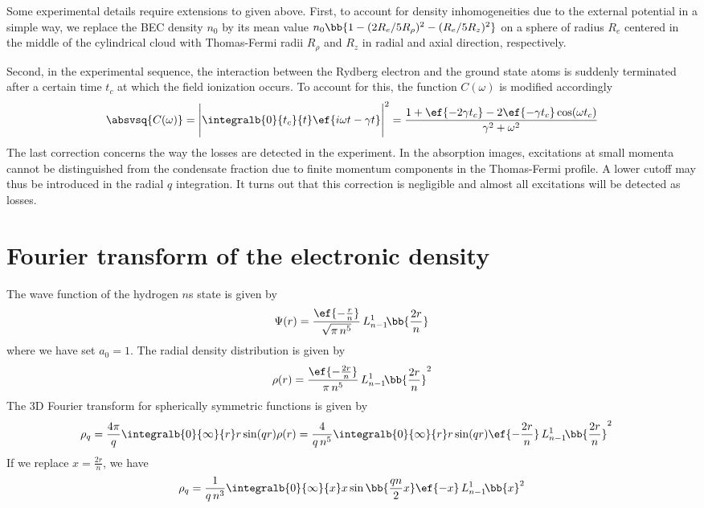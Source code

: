 Some experimental details require extensions to  given above.
First, to account for density inhomogeneities due to the external potential in a simple way, we replace the BEC density $n_0$ by its mean value $n_0 \bb{1-(2R_e/5R_\rho)^2 - (R_e/5R_z)^2}$ on a sphere of radius $R_e$ centered in the middle of the cylindrical cloud with Thomas-Fermi radii $R_\rho$ and $R_z$ in radial and axial direction, respectively.

Second, in the experimental sequence, the interaction between the Rydberg electron and the ground state atoms is suddenly terminated after a certain time $t_c$ at which the field ionization occurs. To account for this, the function $C(\omega)$ is modified accordingly
\begin{align}
\absvsq{C(\omega)}=\Bigg| \integralb{0}{t_c}{t}\ef{i\omega t-\gamma t} \Bigg|^2=\frac{1+\ef{-2\gamma t_c} -2 \ef{-\gamma t_c} \cos(\omega t_c)}{\gamma^2+\omega^2}
\end{align}
The last correction concerns the way the losses are detected in the experiment. In the absorption images, excitations at small momenta cannot be distinguished from the condensate fraction due to finite momentum components in the Thomas-Fermi profile. A lower cutoff may thus be introduced in the radial $q$ integration. It turns out that this correction is negligible and almost all excitations will be detected as losses.

\section{Fourier transform of the electronic density}
The wave function of the hydrogen $n$s state is given by
\begin{align}
\Psi(r)=\frac{\ef{-\frac{r}{n}}}{\sqrt{\pi\, n^5}} \, L_{n-1}^1\!\bb{\frac{2 r}{n}}
\end{align}
where we have set $a_0=1$. The radial density distribution is given by
\begin{align}
\rho(r)=\frac{\ef{-\frac{2r}{n}}}{\pi\, n^5} \, L_{n-1}^1\!\bb{\frac{2 r}{n}}^2
\end{align}
The 3D Fourier transform for spherically symmetric functions is given by
\begin{align}
\rho_q=\frac{4\pi}{q}\integralb{0}{\infty}{r} r \sin(qr) \rho(r)
&=\frac{4}{q\,n^5}\integralb{0}{\infty}{r} r \sin(qr) \ef{-\frac{2r}{n}} \, L_{n-1}^1\!\bb{\frac{2 r}{n}}^2
\end{align}
If we replace $x=\frac{2r}{n}$, we have
\begin{align}
\rho_q=\frac{1}{q\,n^3}\integralb{0}{\infty}{x} x \sin\bb{\frac{qn}{2}x} \ef{-x} \, L_{n-1}^1\!\bb{x}^2
\end{align}

